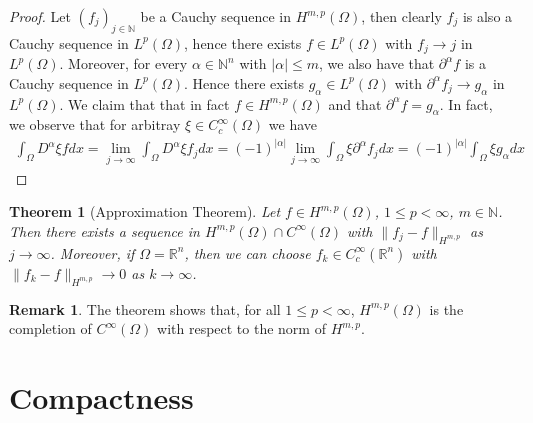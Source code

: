 \documentclass[11pt,a4paper]{article}
\newtheorem{thm}{Theorem}[section]
\theoremstyle{definition}
\newtheorem{rem}{Remark}[section]
\begin{document}
\begin{proof}
Let $(f_j)_{j \in \mathbb{N}}$ be a Cauchy sequence in $H^{m,p}( \Omega)$, then clearly $f_j$ is also a Cauchy sequence in $L^p( \Omega)$, hence there exists $f \in L^p( \Omega)$ with $f_j \to j$ in $L^p(\Omega)$. Moreover, for every $\alpha \in \mathbb{N}^n$ with $| \alpha| \leq m$, we also have that $\partial^\alpha f$ is a Cauchy sequence in $L^p(\Omega)$. Hence there exists $g_\alpha \in L^p( \Omega)$ with $\partial^\alpha f_j \to g_\alpha$ in $L^p(\Omega)$. We claim that that in fact $f \in H^{m,p}(\Omega)$ and that $\partial^\alpha f = g_\alpha$. In fact, we observe that for arbitray $\xi \in C_c^\infty(\Omega)$ we have
\begin{align*}
\int_{\Omega} D^\alpha \xi f dx = \lim_{j \to \infty} \int_{\Omega} D^\alpha \xi f_j dx = (-1)^{| \alpha|} \lim_{j \to \infty} \int_\Omega \xi \partial^\alpha f_j dx = (-1)^{|\alpha|} \int_\Omega \xi g_\alpha dx
\end{align*}
\end{proof}
\begin{thm}[Approximation Theorem] Let $f \in H^{m,p}(\Omega)$, $1 \leq p < \infty$, $m \in \mathbb{N}$. Then there exists a sequence in $H^{m,p}(\Omega) \cap C^\infty( \Omega)$ with $\| f_j-f\|_{H^{m,p}}$ as $j \to \infty$. Moreover, if $\Omega = \mathbb{R}^n$, then we can choose $f_k \in C_c^\infty( \mathbb{R}^n)$ with $\|f_k-f\|_{H^{m,p}} \to 0$ as $k \to \infty$.
\end{thm}
\begin{rem} The theorem shows that, for all $1 \leq p < \infty$, $H^{m,p}(\Omega)$ is the completion of $C^\infty(\Omega)$ with respect to the norm of $H^{m,p}$. 
\end{rem}
\section{Compactness}
\end{document}
